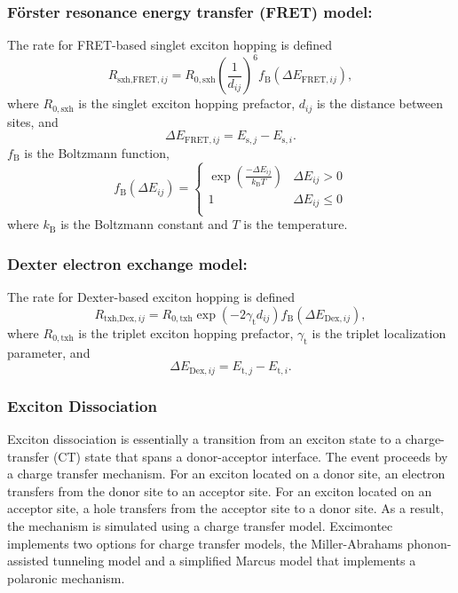 \documentclass[%
 reprint,onecolumn,notitlepage,
superscriptaddress,longbibliography,
 amsmath,amssymb,
 aps,rmp,floatfix,
]{revtex4-1}
\begin{document}
\subsubsection*{\textbf{F{\"o}rster resonance energy transfer (FRET) model:}}

The rate for FRET-based singlet exciton hopping is defined
$$R_{\text{sxh,FRET},ij} = R_{0,\text{sxh}} \left( \frac{1}{d_{ij}} \right)^6 f_\text{B} \left( \Delta E_{\text{FRET},ij}\right),$$
where $R_{0,\text{sxh}}$ is the singlet exciton hopping prefactor, $d_{ij}$ is the distance between sites, and
$$\Delta E_{\text{FRET},ij} = E_{\text{s},j} - E_{\text{s},i}.$$
$f_\text{B}$ is the Boltzmann function,
$$f_\text{B} \left( \Delta E_{ij}\right) = \begin{cases}
\exp{\left( \frac{-\Delta E_{ij}}{k_\text{B} T} \right)} & \Delta E_{ij} > 0 \\
1 & \Delta E_{ij} \le 0 \\
\end{cases}$$
where $k_\text{B}$ is the Boltzmann constant and $T$ is the temperature.

\subsubsection*{\textbf{Dexter electron exchange model:}}

The rate for Dexter-based exciton hopping is defined
$$R_{\text{txh,Dex},ij} = R_{0,\text{txh}} \exp{\left(- 2 \gamma_{\text{t}} d_{ij} \right)} f_\text{B} \left( \Delta E_{\text{Dex},ij}\right),$$
where $R_{0,\text{txh}}$ is the triplet exciton hopping prefactor, $\gamma_{\text{t}}$ is the triplet localization parameter, and
$$\Delta E_{\text{Dex},ij} = E_{\text{t},j} - E_{\text{t},i}.$$

\subsubsection{Exciton Dissociation}

Exciton dissociation is essentially a transition from an exciton state to a charge-transfer (CT) state that spans a donor-acceptor interface. 
The event proceeds by a charge transfer mechanism. 
For an exciton located on a donor site, an electron transfers from the donor site to an acceptor site. 
For an exciton located on an acceptor site, a hole transfers from the acceptor site to a donor site. 
As a result, the mechanism is simulated using a charge transfer model. 
Excimontec implements two options for charge transfer models, the Miller-Abrahams phonon-assisted tunneling model\cite{miller1960pr} and a simplified Marcus model \cite{marcus1956jcp} that implements a polaronic mechanism.
\end{document}
